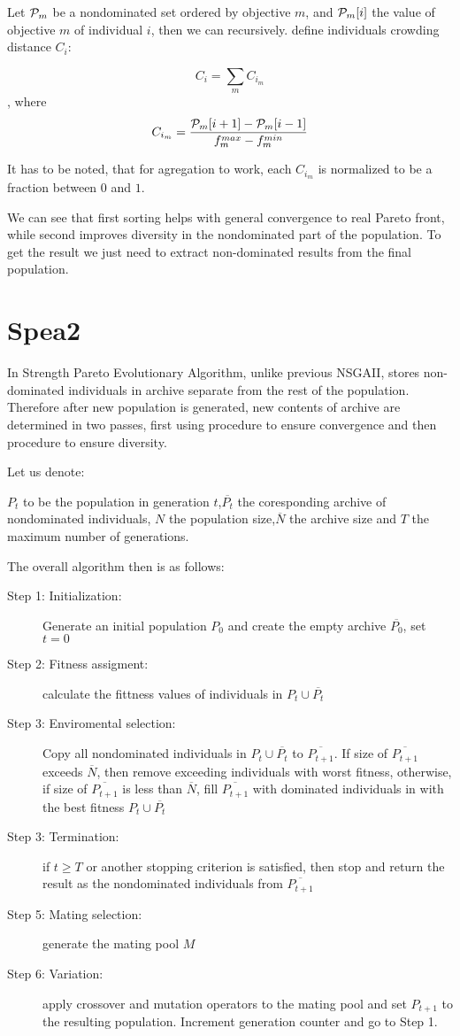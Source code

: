 \documentclass[12pt,oneside]{fithesis2}
\begin{document}
Let ${\cal P}_m$ be a nondominated set ordered by objective $m$, and ${\cal P}_m[i]$ the value of objective $m$ of individual $i$, then we can recursively. define individuals crowding distance $C_i$:

$$C_i = \sum\limits_{m} C_{i_m} $$, where $$C_{i_m} = \frac{{\cal P}_m[i+1] - {\cal P}_m[i-1]}{f^{max}_m - f^{min}_m}$$

It has to be noted, that for agregation to work, each $C_{i_m}$ is normalized to be a fraction between $0$ and $1$. 

We can see that first sorting helps with general convergence to real Pareto front, while second improves diversity in the nondominated part of the population. To get the result we just need to extract non-dominated results from the final population. 

\section{Spea2}
In Strength Pareto Evolutionary Algorithm\cite{zitzler2001spea2}, unlike previous NSGAII, stores non-dominated individuals in archive separate from the rest of the population. Therefore after new population is generated, new contents of archive are determined in two passes, first using procedure to ensure convergence and then procedure to ensure diversity.

Let us denote:

$P_t$ to be the population in generation $t$,$\overline{P_t}$ the coresponding archive of nondominated individuals, $N$ the population size,$\overline N$ the archive size and $T$ the maximum number of generations.

The overall algorithm then is as follows:

\begin{description}
	\item[Step 1: Initialization:] Generate an initial population $P_0$ and create the empty archive $\overline{P_0}$, set $t=0$
	\item[Step 2: Fitness assigment:] calculate the fittness values of individuals in $P_t \cup \overline{P_t}$
	\item[Step 3: Enviromental selection:] Copy all nondominated individuals in $P_t \cup \overline{P_t}$ to $\overline{P_{t+1}}$. If size of $\overline{P_{t+1}}$ exceeds $\overline N$, then remove exceeding individuals with worst fitness, otherwise, if size of $\overline{P_{t+1}}$ is less than $\overline N$, fill $\overline{P_{t+1}}$ with dominated individuals in  with the best fitness $P_t \cup \overline{P_t}$
	\item[Step 3: Termination:] if $t \geq T$ or another stopping criterion is satisfied, then stop and return the result as the nondominated individuals from $\overline{P_{t+1}}$
	\item[Step 5: Mating selection:] generate the mating pool $M$
	\item[Step 6: Variation:] apply crossover and mutation operators to the mating pool and set $P_{t+1}$ to the resulting population. Increment generation counter and go to Step 1.
\end{description}
\end{document}

